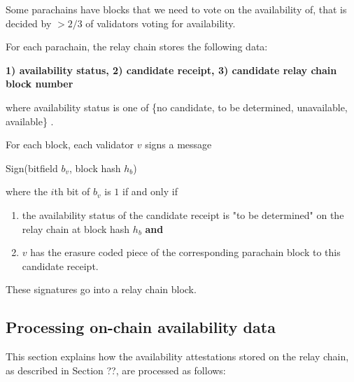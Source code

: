 Some parachains have blocks that we need to vote on the availability of, that is
decided by $> 2/3$ of validators voting for availability. 
\newline

For each parachain, the relay chain stores the following data:

\textbf{1) availability status, 2) candidate receipt, 3) candidate relay chain block number}

where availability status is one of \{no candidate, to be determined,
unavailable, available\} .

For each block, each validator $v$ signs a message

Sign(bitfield $b_v$, block hash $h_b$)

where the $i$th bit of $b_v$ is $1$ if and only if

\begin{enumerate}
\item the availability status of the candidate receipt is "to be determined" on
the relay chain at block hash $h_b$ \textbf{and}

\item $v$ has the erasure coded piece of the corresponding parachain block to
this candidate receipt.
\end{enumerate}

These signatures go into a relay chain block.

\subsection{Processing on-chain availability data}
This section explains how the availability attestations stored on the relay
chain, as described in Section ??, are processed as follows:

